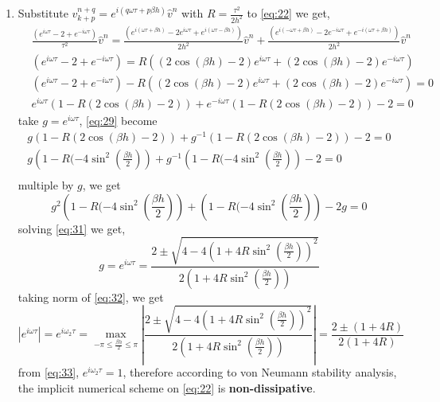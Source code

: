 \documentclass[a4paper,12pt]{article}
\begin{document}
\begin{enumerate}
	\item Substitute $v_{k+p}^{n+q} = e^{i(q\omega\tau + p\beta h)}\hat{v}^n$ with $R=\frac{\tau^2}{2h^2}$ to \eqref{eq:22} we get,
	\begin{equation}\label{eq:29}
	\begin{aligned}
	&\frac{(e^{i\omega\tau} -2 + e^{-i\omega\tau})}{\tau^2}\hat{v}^n = \frac{(e^{i(\omega\tau+\beta h)}-2e^{i\omega\tau}+e^{i(\omega\tau-\beta h)})}{2h^2}\hat{v}^n + \frac{(e^{i(-\omega\tau+\beta h)}-2e^{-i\omega\tau}+e^{-i(\omega\tau+\beta h)})}{2h^2}\hat{v}^n\\
	&(e^{i\omega\tau}-2+e^{-i\omega\tau}) = R \left( (2\cos(\beta h)-2)e^{i\omega\tau} + (2\cos(\beta h)-2)e^{-i\omega\tau} \right)\\
	&(e^{i\omega\tau}-2+e^{-i\omega\tau}) - R \left( (2\cos(\beta h)-2)e^{i\omega\tau} + (2\cos(\beta h)-2)e^{-i\omega\tau} \right) = 0\\
	&e^{i\omega\tau} \left( 1- R (2\cos(\beta h)-2)\right) + e^{-i\omega\tau} \left( 1- R (2\cos(\beta h)-2)\right) -2 = 0
	\end{aligned}
	\end{equation}
	take $g=e^{i\omega\tau}$, \eqref{eq:29} become
	\begin{equation}
	\begin{aligned}
	g \left( 1- R (2\cos(\beta h)-2)\right) + g^{-1} \left( 1- R (2\cos(\beta h)-2)\right) -2 = 0\\
	g \left( 1- R (-4\sin^2(\frac{\beta h}{2})\right) + g^{-1} \left( 1- R (-4\sin^2(\frac{\beta h}{2})\right) -2 = 0\\
	\end{aligned}
	\end{equation}
	multiple by $g$, we get
	\begin{equation}\label{eq:31}
	g^2 \left( 1- R (-4\sin^2(\frac{\beta h}{2})\right) + \left( 1- R (-4\sin^2(\frac{\beta h}{2})\right) -2g = 0
	\end{equation}
	solving \eqref{eq:31} we get,
	\begin{equation}\label{eq:32}
	g = e^{i\omega\tau} = \frac{2\pm \sqrt{4-4(1+4R\sin^2(\frac{\beta h}{2}))^2}}{2(1+4R\sin^2(\frac{\beta h}{2}))}
	\end{equation}
	taking norm of \eqref{eq:32}, we get
	\begin{equation}\label{eq:33}
	|e^{i\omega\tau}| = e^{i\omega_2\tau} = \max_{-\pi \leq \frac{\beta h}{2} \leq \pi} \left| \frac{2\pm \sqrt{4-4(1+4R\sin^2(\frac{\beta h}{2}))^2}}{2(1+4R\sin^2(\frac{\beta h}{2}))} \right| = \frac{2\pm (1+4R)}{2(1+4R)}
	\end{equation}
	from \eqref{eq:33}, $e^{i\omega_2\tau} = 1$, therefore according to von Neumann stability analysis, the implicit numerical scheme on \eqref{eq:22} is \textbf{non-dissipative}.
	

\end{enumerate}
\end{document}
